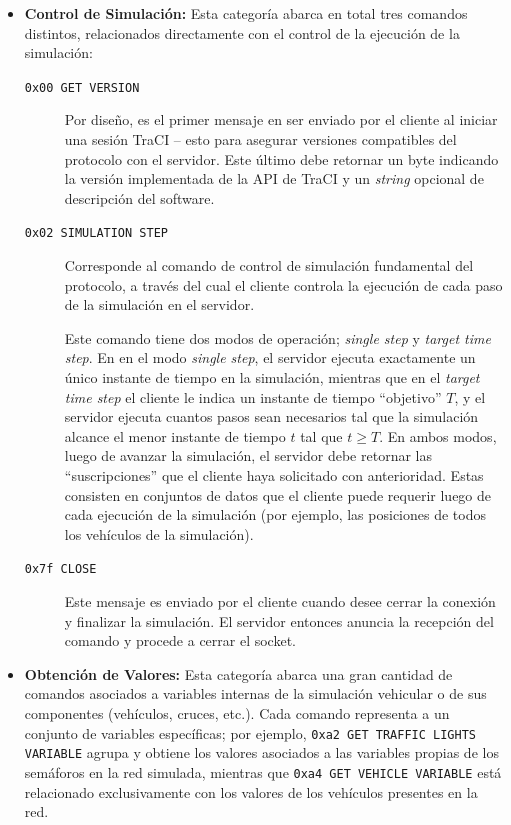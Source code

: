 \begin{itemize}
    \item \textbf{Control de Simulación:} Esta categoría abarca en total tres comandos distintos, relacionados directamente con el control de la ejecución de la simulación:

    \begin{description}
        \item [\texttt{0x00 GET VERSION}] Por diseño, es el primer mensaje en ser enviado por el cliente al iniciar una sesión TraCI -- esto para asegurar versiones compatibles del protocolo con el servidor. Este último debe retornar un byte indicando la versión implementada de la API de TraCI y un \emph{string} opcional de descripción del software.
        
        \item [\texttt{0x02 SIMULATION STEP}] Corresponde al comando de control de simulación fundamental del protocolo, a través del cual el cliente controla la ejecución de cada paso de la simulación en el servidor.
        
        Este comando tiene dos modos de operación; \emph{single step} y \emph{target time step}. En en el modo \emph{single step}, el servidor ejecuta exactamente un único instante de tiempo en la simulación, mientras que en el \emph{target time step} el cliente le indica un instante de tiempo ``objetivo'' $T$, y el servidor ejecuta cuantos pasos sean necesarios tal que la simulación alcance el menor instante de tiempo $t$ tal que $t \geq T$. En ambos modos, luego de avanzar la simulación, el servidor debe retornar las ``suscripciones'' que el cliente haya solicitado con anterioridad. Estas consisten en conjuntos de datos que el cliente puede requerir luego de cada ejecución de la simulación (por ejemplo, las posiciones de todos los vehículos de la simulación).
        
        \item [\texttt{0x7f CLOSE}] Este mensaje es enviado por el cliente cuando desee cerrar la conexión y finalizar la simulación. El servidor entonces anuncia la recepción del comando y procede a cerrar el socket.
    \end{description}
    
    \item \textbf{Obtención de Valores:} Esta categoría abarca una gran cantidad de comandos asociados a variables internas de la simulación vehicular o de sus componentes (vehículos, cruces, etc.). Cada comando representa a un conjunto de variables específicas; por ejemplo, \texttt{0xa2 GET TRAFFIC LIGHTS VARIABLE} agrupa y obtiene los valores asociados a las variables propias de los semáforos en la red simulada, mientras que \texttt{0xa4 GET VEHICLE VARIABLE} está relacionado exclusivamente con los valores de los vehículos presentes en la red.
    

\end{itemize}

